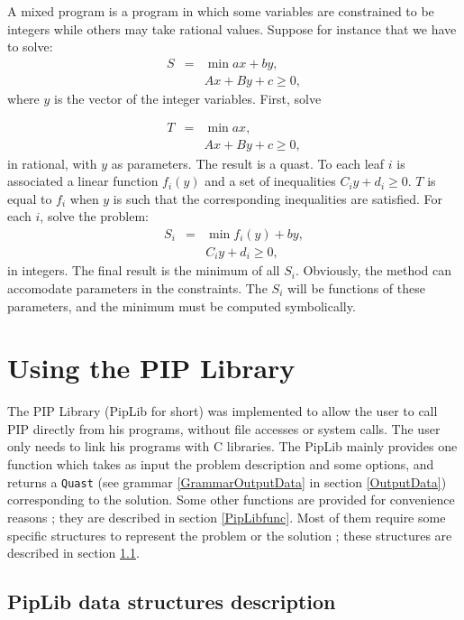 \documentclass[12pt,a4paper]{article}
\begin{document}
A mixed program is a program in which some variables are constrained
to be integers while others may take rational values. Suppose for
instance that we have to solve:
\begin{eqnarray*}
S & = & \min a x + b y,\\
  &   & A x + B y + c \ge 0,
\end{eqnarray*}
where $y$ is the vector of the integer variables. First, solve

\begin{eqnarray*}
T & = & \min a x,\\
  &   & A x + B y + c \ge 0,
\end{eqnarray*}
in rational, with $y$ as parameters. The result is a quast.
To each leaf $i$ is associated a linear function $f_i(y)$
and a set of inequalities $C_i y + d_i \ge 0$. $T$ is equal to
$f_i$ when $y$ is such that the corresponding inequalities
are satisfied. For each $i$, solve the problem:
\begin{eqnarray*}
S_i & = & \min f_i(y) + b y,\\
  &   & C_i y + d_i \ge 0,
\end{eqnarray*}
in integers. The final result is the minimum of all $S_i$.
Obviously, the method can accomodate parameters in the
constraints. The $S_i$ will be functions of these
parameters, and the minimum must be computed symbolically.

%
%
\section{Using the PIP Library}
The PIP Library (PipLib for short) was implemented to allow the user to call PIP
directly from his programs, without file accesses or system calls. The
user only needs to link his programs with C libraries. The
PipLib mainly provides one function which takes as input the problem description
and some options, and returns a {\tt Quast} (see grammar \ref{GrammarOutputData}
in section \ref{OutputData}) corresponding to the solution. Some
other functions are provided for convenience reasons ; they
are described in section \ref{PipLibfunc}. Most of them require
some specific structures to represent the problem or
the solution ; these structures are described in section \ref{PipLibdata}.

\subsection{PipLib data structures description}\label{PipLibdata}
\end{document}
